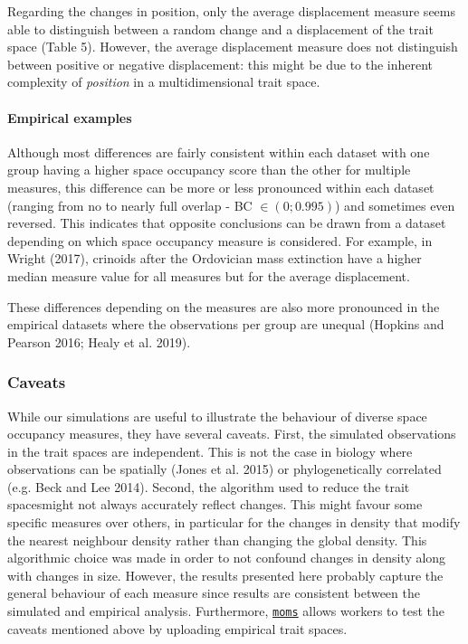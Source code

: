 \documentclass[]{article}
\let\oldparagraph\paragraph
\renewcommand{\paragraph}[1]{\oldparagraph{#1}\mbox{}}
\begin{document}
Regarding the changes in position, only the average displacement measure
seems able to distinguish between a random change and a displacement of
the trait space (Table 5). However, the average displacement measure
does not distinguish between positive or negative displacement: this
might be due to the inherent complexity of \emph{position} in a
multidimensional trait space.

\paragraph{Empirical examples}\label{empirical-examples-1}

Although most differences are fairly consistent within each dataset with
one group having a higher space occupancy score than the other for
multiple measures, this difference can be more or less pronounced within
each dataset (ranging from no to nearly full overlap - BC
\(\in(0;0.995)\)) and sometimes even reversed. This indicates that
opposite conclusions can be drawn from a dataset depending on which
space occupancy measure is considered. For example, in Wright (2017),
crinoids after the Ordovician mass extinction have a higher median
measure value for all measures but for the average displacement.

These differences depending on the measures are also more pronounced in
the empirical datasets where the observations per group are unequal
(Hopkins and Pearson 2016; Healy et al. 2019).

\subsubsection{Caveats}\label{caveats}

While our simulations are useful to illustrate the behaviour of diverse
space occupancy measures, they have several caveats. First, the
simulated observations in the trait spaces are independent. This is not
the case in biology where observations can be spatially (Jones et al.
2015) or phylogenetically correlated (e.g. Beck and Lee 2014). Second,
the algorithm used to reduce the trait spacesmight not always accurately
reflect changes. This might favour some specific measures over others,
in particular for the changes in density that modify the nearest
neighbour density rather than changing the global density. This
algorithmic choice was made in order to not confound changes in density
along with changes in size. However, the results presented here probably
capture the general behaviour of each measure since results are
consistent between the simulated and empirical analysis. Furthermore,
\href{https://tguillerme.shinyapps.io/moms/}{\texttt{moms}} allows
workers to test the caveats mentioned above by uploading empirical trait
spaces.
\end{document}
